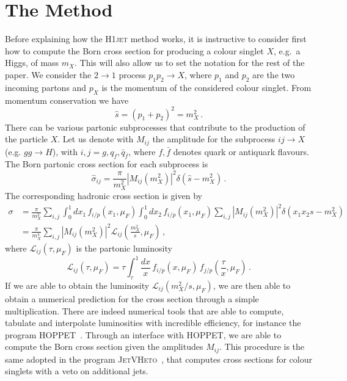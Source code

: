 \documentclass[12pt]{article}
\begin{document}
\section{The Method}
\label{sec:method}
Before explaining how the \textsc{H1jet} method works, it is instructive to
consider first how to compute the Born cross section for producing a
colour singlet $X$, e.g.\ a Higgs, of mass $m_X$. This will also allow
us to set the notation for the rest of the paper. We consider the
$2\to 1$ process $p_1 p_2 \to X$, where $p_1$ and $p_2$ are the two incoming
partons and $p_X$ is the momentum of the considered colour
singlet. From momentum conservation we have 
\begin{equation}
  \label{eq:mom-conservation}
  \hat s = (p_1+p_2)^2=m_X^2\,.
\end{equation}
There can be various partonic subprocesses that contribute to the
production of the particle $X$. Let us denote with $M_{ij}$ the
amplitude for the subprocess $ij\to X$ (e.g. $gg \to H$), with
$i,j=g,q_f,\bar q_{\bar f}$, where $f,\bar f$ denotes quark or
antiquark flavours. The Born partonic cross section for each
subprocess is
\begin{equation}
  \label{eq:Born-xsct}
  \hat\sigma_{ij}=\frac{\pi}{m_X^2} |M_{ij}(m_X^2)|^2 \delta\left(\hat s-m_X^2\right)\,.
\end{equation}
The corresponding hadronic cross section is given by
\begin{equation}
  \label{eq:Born-had}
  \begin{split}
  \sigma& =\frac{\pi}{m_X^2}\sum_{i,j} \int_0^1 dx_1\, f_{i/p}(x_1,\mu_F)\int_0^1 dx_2 \, f_{i/p}(x_1,\mu_F)\sum_{i,j}
 |M_{ij}(m_X^2)|^2 \delta\left(x_1 x_2 s-m_X^2\right)\\
   & = \frac{\pi}{m_X^4} \sum_{i,j} |M_{ij}(m_X^2)|^2 \mathcal{L}_{ij}\left(\frac{m_X^2}{s},\mu_F\right)
  \,,
    \end{split}
\end{equation}
where $\mathcal{L}_{ij}\left(\tau,\mu_F\right)$ is the partonic luminosity
\begin{equation}
  \label{eq:hoppet-lumi}
  \mathcal{L}_{ij}\left(\tau,\mu_F\right) = \tau \int_\tau^1 \frac{dx}{x}\, f_{i/p}(x,\mu_F)\, f_{j/p}\left(\frac{\tau}{x},\mu_F\right)\,.
\end{equation}
If we are able to obtain the luminosity
$\mathcal{L}_{ij}\left(m_X^2/s,\mu_F\right)$, we are then able to
obtain a numerical prediction for the cross section through a simple
multiplication. There are indeed numerical tools that are able to
compute, tabulate and interpolate luminosities with incredible
efficiency, for instance the program
\textsc{HOPPET}~\cite{Salam:2008qg}. Through an interface with \textsc{HOPPET}, we are
able to compute the Born cross section given the amplitudes
$M_{ij}$. This procedure is the same adopted in the program
\textsc{JetVHeto}~\cite{Banfi:2015pju}, that computes cross sections for colour
singlets with a veto on additional jets.
\end{document}
